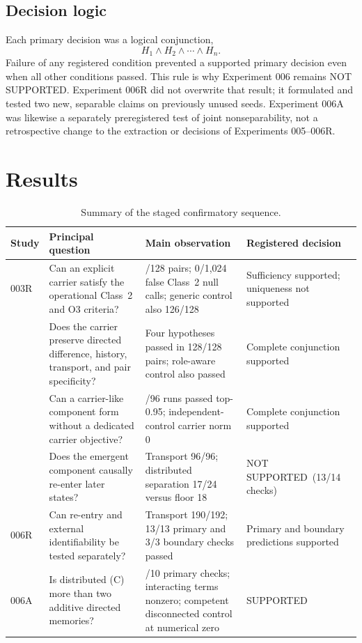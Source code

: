 \documentclass[11pt,a4paper]{article}
\newcommand{\statussupported}{\textsf{SUPPORTED}}
\newcommand{\statusnotsupported}{\textsf{NOT SUPPORTED}}
\begin{document}
\subsection{Decision logic}

Each primary decision was a logical conjunction,
\begin{equation}
  H_1 \land H_2 \land \cdots \land H_n.
\end{equation}
Failure of any registered condition prevented a supported primary decision even when all other conditions passed. This rule is why Experiment 006 remains \statusnotsupported. Experiment 006R did not overwrite that result; it formulated and tested two new, separable claims on previously unused seeds. Experiment 006A was likewise a separately preregistered test of joint nonseparability, not a retrospective change to the extraction or decisions of Experiments 005--006R.

\section{Results}

\begin{table}[H]
\centering
\footnotesize
\caption{Summary of the staged confirmatory sequence.}
\label{tab:summary}
\begin{tabular}{@{}>{\raggedright\arraybackslash}p{1.15cm}>{\raggedright\arraybackslash}p{5.25cm}>{\raggedright\arraybackslash}p{4.9cm}>{\raggedright\arraybackslash}p{2.45cm}@{}}
\toprule
Study & Principal question & Main observation & Registered decision \\
\midrule
003R & Can an explicit carrier satisfy the operational Class~2 and O3 criteria? & 126/128 pairs; 0/1,024 false Class~2 null calls; generic control also 126/128 & Sufficiency supported; uniqueness not supported \\
004 & Does the carrier preserve directed difference, history, transport, and pair specificity? & Four hypotheses passed in 128/128 pairs; role-aware control also passed & Complete conjunction supported \\
005 & Can a carrier-like component form without a dedicated carrier objective? & 84/96 runs passed top-0.95; independent-control carrier norm 0 & Complete conjunction supported \\
006 & Does the emergent component causally re-enter later states? & Transport 96/96; distributed separation 17/24 versus floor 18 & \statusnotsupported\ (13/14 checks) \\
006R & Can re-entry and external identifiability be tested separately? & Transport 190/192; 13/13 primary and 3/3 boundary checks passed & Primary and boundary predictions supported \\
006A & Is distributed (C) more than two additive directed memories? & 10/10 primary checks; interacting terms nonzero; competent disconnected control at numerical zero & \statussupported \\
\bottomrule
\end{tabular}
\end{table}
\end{document}
